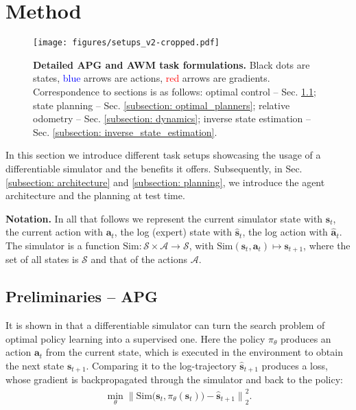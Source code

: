 \section{Method}
\label{sec: method}

\begin{figure}[t]
    \centering
    \texttt{[image: figures/setups\_v2-cropped.pdf]}
    \captionsetup{belowskip=-0.35cm, aboveskip=0.2cm}
    \caption{\textbf{Detailed APG and AWM task formulations.} Black dots are states, \textcolor{blue}{blue} arrows are actions, \textcolor{red}{red} arrows are gradients. Correspondence to sections is as follows: optimal control -- Sec. \ref{subsection: apg}; state planning -- Sec. \ref{subsection: optimal_planners}; relative odometry -- Sec. \ref{subsection: dynamics}; inverse state estimation -- Sec. \ref{subsection: inverse_state_estimation}.}
    \label{fig: diffenv_diagrams}
\end{figure}

In this section we introduce different task setups showcasing the usage of a differentiable simulator and the benefits it offers. Subsequently, in Sec. \ref{subsection: architecture} and \ref{subsection: planning}, we introduce the agent architecture and the planning at test time. 

\textbf{Notation.} In all that follows we represent the current simulator state with $\mathbf{s}_t$, the current action with $\mathbf{a}_t$, the log (expert) state with $\hat{\mathbf{s}}_t$, the log action with $\hat{\mathbf{a}}_t$. The simulator is a function $\text{Sim}: \mathcal{S} \times \mathcal{A} \rightarrow \mathcal{S}$, with $\text{Sim}(\mathbf{s}_t, \mathbf{a}_t) \mapsto \mathbf{s}_{t + 1}$, where the set of all states is $\mathcal{S}$ and that of the actions $\mathcal{A}$.

\subsection{Preliminaries -- APG}
\label{subsection: apg}

It is shown in \cite{nachkov2024autonomous} that a differentiable simulator can turn the search problem of optimal policy learning into a supervised one. Here the policy $\pi_\theta$ produces an action $\mathbf{a}_t$ from the current state, which is executed in the environment to obtain the next state $\mathbf{s}_{t+1}$. Comparing it to the log-trajectory $\hat{\mathbf{s}}_{t+1}$ produces a loss, whose gradient is backpropagated through the simulator and back to the policy:
\begin{equation} \label{eq:apg}
\begin{aligned}
\min_\theta {\Big\lVert \text{Sim} \big(\mathbf{s}_t, \pi_\theta (\mathbf{s}_t) \big) - \hat{\mathbf{s}}_{t+1} \Big\rVert}_2^2.
\end{aligned}
\end{equation}


